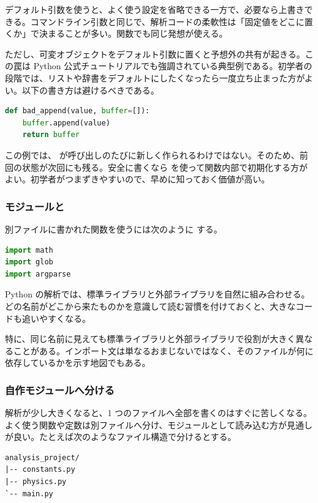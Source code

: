 デフォルト引数を使うと、よく使う設定を省略できる一方で、必要なら上書きできる。コマンドライン引数と同じで、解析コードの柔軟性は「固定値をどこに置くか」で決まることが多い。関数でも同じ発想が使える。

ただし、可変オブジェクトをデフォルト引数に置くと予想外の共有が起きる。この罠は Python 公式チュートリアルでも強調されている典型例である。初学者の段階では、リストや辞書をデフォルトにしたくなったら一度立ち止まった方がよい。以下の書き方は避けるべきである。

\begin{lstlisting}[language=Python]
def bad_append(value, buffer=[]):
    buffer.append(value)
    return buffer
\end{lstlisting}

この例では、 が呼び出しのたびに新しく作られるわけではない。そのため、前回の状態が次回にも残る。安全に書くなら  を使って関数内部で初期化する方がよい。初学者がつまずきやすいので、早めに知っておく価値が高い。

\subsubsection{モジュールと }

別ファイルに書かれた関数を使うには次のように  する。

\begin{lstlisting}[language=Python]
import math
import glob
import argparse
\end{lstlisting}

Python の解析では、標準ライブラリと外部ライブラリを自然に組み合わせる。どの名前がどこから来たものかを意識して読む習慣を付けておくと、大きなコードも追いやすくなる。

特に、同じ名前に見えても標準ライブラリと外部ライブラリで役割が大きく異なることがある。インポート文は単なるおまじないではなく、そのファイルが何に依存しているかを示す地図でもある。

\subsubsection{自作モジュールへ分ける}

解析が少し大きくなると、1 つのファイルへ全部を書くのはすぐに苦しくなる。よく使う関数や定数は別ファイルへ分け、モジュールとして読み込む方が見通しが良い。たとえば次のようなファイル構造で分けるとする。

\begin{lstlisting}[numbers=none, xleftmargin=2\zw]
analysis_project/
|-- constants.py
|-- physics.py
`-- main.py
\end{lstlisting}

